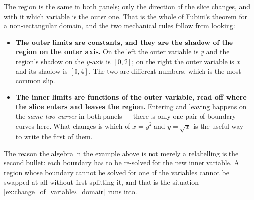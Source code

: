 \begin{center}
\end{center}

\begin{remark}
\label{rem:fubini_swap_picture}
The region is the same in both panels; only the direction of the slice changes, and with it which
variable is the outer one. That is the whole of Fubini's theorem for a non-rectangular domain, and
the two mechanical rules follow from looking:

\begin{itemize}
  \item \textbf{The outer limits are constants, and they are the shadow of the region on the outer
    axis.} On the left the outer variable is $y$ and the region's shadow on the $y$-axis is
    $[0,2]$; on the right the outer variable is $x$ and its shadow is $[0,4]$. The two are
    different numbers, which is the most common slip.
  \item \textbf{The inner limits are functions of the outer variable, read off where the slice
    enters and leaves the region.} Entering and leaving happens on the \emph{same two curves} in
    both panels --- there is only one pair of boundary curves here. What changes is which of
    $x = y^2$ and $y = \sqrt{x}$ is the useful way to write the first of them.
\end{itemize}

The reason the algebra in the example above is not merely a relabelling is the second bullet: each
boundary has to be re-solved for the new inner variable. A region whose boundary cannot be solved
for one of the variables cannot be swapped at all without first splitting it, and that is the
situation \cref{ex:change_of_variables_domain} runs into.
\end{remark}

